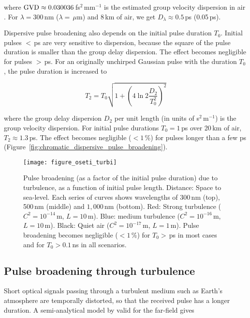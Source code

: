\documentclass[twocolumn,tighten,longauthor]{myaastex62}
\begin{document}
where ${\rm GVD}\approx0.030036\,$fs$^2$\,mm$^{-1}$ is the estimated group velocity dispersion in air \citep{Ciddor1996}. For $\lambda=300\,$nm ($\lambda=\,\mu$m) and 8\,km of air, we get $D_{\lambda}\approx0.5\,$ps (0.05\,ps).

Dispersive pulse broadening also depends on the initial pulse duration $T_0$. Initial pulses $<\,$ps are very sensitive to dispersion, because the square of the pulse duration is smaller than the group delay dispersion. The effect becomes negligible for pulses $>$\,ps. For an originally unchirped Gaussian pulse with the duration $T_0$, the pulse duration is increased to \citep{boyd2013nonlinear}

\begin{equation}
T_2 = T_0 \sqrt{1+ \left( 4 \ln 2 \frac{D_2}{T_0^2} \right)^2 }
\end{equation}

where the group delay dispersion $D_2$ per unit length (in units of s$^2$\,m$^{-1}$) is the group velocity dispersion. For initial pulse durations $T_0=1$\,ps over 20\,km of air, $T_2\approx1.3\,$ps. The effect becomes negligible ($<1\,$\%) for pulses longer than a few ps (Figure~\ref{fig:chromatic_dispersive_pulse_broadening}).


\begin{figure}
\texttt{[image: figure\_oseti\_turbi]}
\caption{\label{fig:turbi}Pulse broadening (as a factor of the initial pulse duration) due to turbulence, as a function of initial pulse length. Distance: Space to sea-level. Each series of curves shows wavelengths of 300\,nm (top), 500\,nm (middle) and $1{,}000\,$nm (bottom). Red: Strong turbulence ($C^2=10^{-14}\,$m, $L=10\,$m). Blue: medium turbulence ($C^2=10^{-16}\,$m, $L=10\,$m). Black: Quiet air ($C^2=10^{-17}\,$m, $L=1\,$m). Pulse broadening becomes negligible ($<1\,$\%) for $T_0>$\,ps in most cases and for $T_0>0.1$\,ns in all scenarios.}
\end{figure}


\subsection{Pulse broadening through turbulence}
\label{sub:pulse_broad_turbi}
Short optical signals passing through a turbulent medium such as Earth's atmosphere are temporally distorted, so that the received pulse has a longer duration. A semi-analytical model by \citet{1998ApOpt..37.7655Y} valid for the far-field \citep{TjinThamSjin1998} gives
\end{document}
